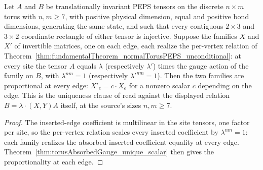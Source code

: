 \begin{theorem}%
    \label{thm:torusGauge_unique_scalar_of_perVertex}
    \leanok
    Let $A$ and $B$ be translationally invariant PEPS tensors on the discrete
    $n\times m$ torus with $n,m\geq 7$, with positive physical dimension,
    equal and positive bond dimensions, generating the same state, and such
    that every contiguous
    $2\times 3$ and $3\times 2$ coordinate rectangle of either tensor is
    injective.  Suppose the families $X$ and $X'$ of invertible matrices, one
    on each edge, each realize the per-vertex relation of
    Theorem~\ref{thm:fundamentalTheorem_normalTorusPEPS_unconditional}: at
    every site the tensor $A$ equals $\lambda$ (respectively $\lambda'$)
    times the gauge action of the family on $B$, with $\lambda^{nm} = 1$
    (respectively $\lambda'^{nm} = 1$).  Then the two families are
    proportional at every edge: $X'_e = c\cdot X_e$ for a nonzero scalar $c$
    depending on the edge.
    This is the uniqueness clause of \cite[Theorem~3]{Molnar2018NormalPEPS}
    read against the displayed relation $B = \lambda\cdot(X,Y)A$ itself, at
    the source's sizes $n,m\geq 7$.
    \begin{proof}
        \leanok
        The inserted-edge coefficient is multilinear in the site tensors, one
        factor per site, so the per-vertex relation scales every inserted
        coefficient by $\lambda^{nm} = 1$: each family realizes the absorbed
        inserted-coefficient equality at every edge.
        Theorem~\ref{thm:torusAbsorbedGauge_unique_scalar} then gives the
        proportionality at each edge.
    \end{proof}
\end{theorem}
